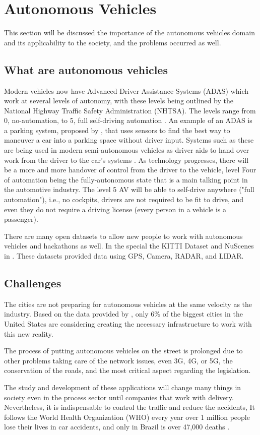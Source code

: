 \section{Autonomous Vehicles} \label{autonomous-vehicles}

This section will be discussed the importance of the autonomous vehicles domain and its applicability to the society, and the problems occurred as well. 

\subsection{What are autonomous vehicles}
Modern vehicles now have Advanced Driver Assistance Systems (ADAS)
which work at several levels of autonomy, with these levels being
outlined by the National Highway Traffic Safety Administration
(NHTSA). The levels range from 0, no-automation, to 5, full self-driving automation \cite{national2013preliminary}. An example of an ADAS is a parking system, proposed by \cite{krasner2016automatic}, that uses sensors to find the best way to maneuver a car into a parking space without driver input. Systems such as these are being used in modern semi-autonomous
vehicles as driver aids to hand over work from the driver to the
car’s systems \cite{schoning2006parklenkassistent}. As technology progresses, there will be a more
and more handover of control from the driver to the vehicle, level
Four of automation being the fully-autonomous state that is a main talking point in the automotive industry. The level 5 AV will
be able to self-drive anywhere ("full automation"), i.e., no cockpits,
drivers are not required to be fit to drive, and even they do not require a driving license (every person in a vehicle is a passenger).

There are many open datasets to allow new people to work with autonomous vehicles and hackathons as well. In the special the KITTI Dataset \cite{geiger2013vision} and NuScenes in \cite{caesar2020nuscenes}. These datasets provided data using GPS, Camera, RADAR, and LIDAR. 

\subsection{Challenges}

The cities are not preparing for autonomous vehicles at the same velocity as the industry. Based on the data provided by \cite{cutler2015many}, only 6\% of the biggest cities in the United States are considering creating the necessary infrastructure to work with this new reality.

The process of putting autonomous vehicles on the street is prolonged due to other problems taking care of the network issues, even 3G, 4G, or 5G, the conservation of the roads, and the most critical aspect regarding the legislation. 

The study and development of these applications will change many things in society even in the process sector until companies that work with delivery. Nevertheless, it is indispensable to control the traffic and reduce the accidents, It follows the World Health Organization (WHO) every year over 1 million people lose their lives in car accidents, and only in Brazil is over 47,000 deaths \cite{world2004world}. 
